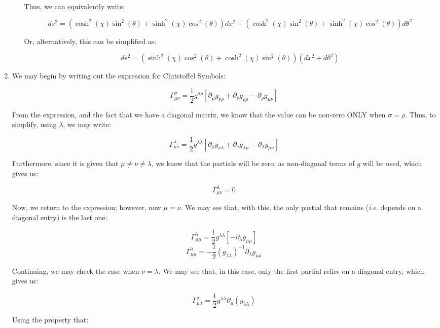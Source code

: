\begin{enumerate}
\begin{enumerate}
        Thus, we can equivalently write:

        $$\boxed{ds^2=(\cosh^2(\chi)\sin^2(\theta)+\sinh^2(\chi)\cos^2(\theta))dx^2 +(\cosh^2(\chi)\sin^2(\theta)+\sinh^2(\chi)\cos^2(\theta))d\theta^2}$$

        Or, alternatively, this can be simplified as:

        $$\boxed{ds^2=(\sinh^2(\chi)\cos^2(\theta)+\cosh^2(\chi)\sin^2(\theta))(dx^2+d\theta^2)}$$

    \end{enumerate}

  \item

    We may begin by writing out the expression for Christoffel Symbols:

      $$\Gamma^{\sigma}_{\mu\nu}=\frac{1}{2}g^{\sigma\rho}\left[ \partial_{\mu}g_{\nu\rho}+\partial_{\nu}g_{\rho\mu}-\partial_{\rho}g_{\mu\nu}  \right]$$

    From the expression, and the fact that we have a diagonal matrix, we know that the value can be non-zero ONLY when $\sigma=\rho$. Thus, to simplify, using $\lambda$, we may write:

      $$\Gamma^{\lambda}_{\mu\nu}=\frac{1}{2}g^{\lambda\lambda}\left[ \partial_{\mu}g_{\nu\lambda}+\partial_{\nu}g_{\lambda\mu}-\partial_{\lambda}g_{\mu\nu}  \right]$$

      Furthermore, since it is given that $\mu\neq\nu\neq\lambda$, we know that the partials will be zero, as non-diagonal terms of $g$ will be used, which gives us:

      $$\boxed{\Gamma^{\lambda}_{\mu\nu}=0}$$

      Now, we return to the expression; however, now $\mu=\nu$. We may see that, with this, the only partial that remains (\textit{i}.\textit{e}. depends on a diagonal entry) is the last one:

      $$\Gamma^{\lambda}_{\mu\mu}=\frac{1}{2}g^{\lambda\lambda}\left[ -\partial_{\lambda}g_{\mu\mu}  \right]$$
      $$\boxed{\Gamma^{\lambda}_{\mu\mu}=-\frac{1}{2}(g_{\lambda\lambda})^{-1}\partial_{\lambda}g_{\mu\mu}}$$

      Continuing, we may check the case when $\nu=\lambda$. We may see that, in this case, only the first partial relies on a diagonal entry, which gives us:

      $$\Gamma^{\lambda}_{\mu\lambda}=\frac{1}{2}g^{\lambda\lambda}\partial_{\mu}(g_{\lambda\lambda})$$

      Using the property that:


\end{enumerate}
